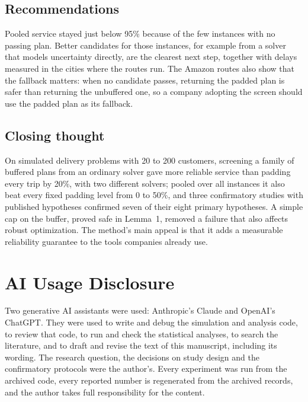 \documentclass[12pt,letterpaper]{article}
\begin{document}
\subsection{Recommendations}

Pooled service stayed just below 95\% because of the few instances with no passing
plan. Better candidates for those instances, for example from a solver that models
uncertainty directly, are the clearest next step, together with delays measured in the
cities where the routes run. The Amazon routes also show that the fallback matters: when no
candidate passes, returning the padded plan is safer than returning the
unbuffered one, so a company adopting the screen should use the padded plan as its
fallback.

\subsection{Closing thought}

On simulated delivery problems with 20 to 200 customers, screening a family of
buffered plans from an ordinary solver gave more reliable service than padding every
trip by 20\%, with two different solvers; pooled over all instances it also beat
every fixed padding level from 0 to 50\%, and three confirmatory studies with
published hypotheses confirmed seven of their eight primary hypotheses. A simple cap
on the buffer, proved safe in Lemma~1, removed a failure that also
affects robust optimization. The method's main appeal is that it adds a measurable
reliability guarantee to the tools companies already use.


\section*{AI Usage Disclosure}
Two generative AI assistants were used: Anthropic's Claude and OpenAI's ChatGPT.
They were used to write and debug the simulation and analysis code, to review that
code, to run and check the statistical analyses, to search the literature, and to
draft and revise the text of this manuscript, including its wording. The research
question, the decisions on study design and the confirmatory protocols were the
author's. Every experiment was run from the archived code, every reported number is
regenerated from the archived records, and the author takes full responsibility for
the content.
\end{document}
